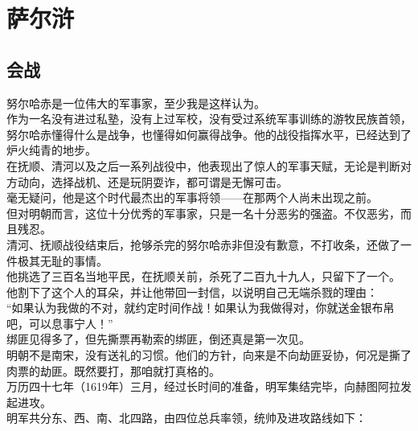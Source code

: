 \section{萨尔浒}
\ifnum{}
	\begin{multicols}{\theparacolNo}
\fi
\subsection{会战}
努尔哈赤是一位伟大的军事家，至少我是这样认为。\\

作为一名没有进过私塾，没有上过军校，没有受过系统军事训练的游牧民族首领，努尔哈赤懂得什么是战争，也懂得如何赢得战争。他的战役指挥水平，已经达到了炉火纯青的地步。\\

在抚顺、清河以及之后一系列战役中，他表现出了惊人的军事天赋，无论是判断对方动向，选择战机、还是玩阴耍诈，都可谓是无懈可击。\\

毫无疑问，他是这个时代最杰出的军事将领——在那两个人尚未出现之前。\\

但对明朝而言，这位十分优秀的军事家，只是一名十分恶劣的强盗。不仅恶劣，而且残忍。\\

清河、抚顺战役结束后，抢够杀完的努尔哈赤非但没有歉意，不打收条，还做了一件极其无耻的事情。\\

他挑选了三百名当地平民，在抚顺关前，杀死了二百九十九人，只留下了一个。\\

他割下了这个人的耳朵，并让他带回一封信，以说明自己无端杀戮的理由：\\

“如果认为我做的不对，就约定时间作战！如果认为我做得对，你就送金银布帛吧，可以息事宁人！”\\

绑匪见得多了，但先撕票再勒索的绑匪，倒还真是第一次见。\\

明朝不是南宋，没有送礼的习惯。他们的方针，向来是不向劫匪妥协，何况是撕了肉票的劫匪。既然要打，那咱就打真格的。\\

万历四十七年（1619年）三月，经过长时间的准备，明军集结完毕，向赫图阿拉发起进攻。\\

明军共分东、西、南、北四路，由四位总兵率领，统帅及进攻路线如下：\\


\end{multicols}
